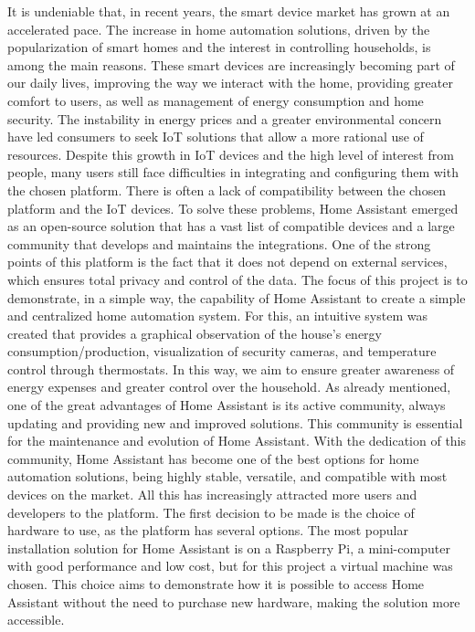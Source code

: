 \documentclass[graybox]{svmult}
\begin{document}
It is undeniable that, in recent years, the smart device market has grown at an accelerated pace. The increase in home automation solutions, driven by the popularization of smart homes and the interest in controlling households, is among the main reasons. These smart devices are increasingly becoming part of our daily lives, improving the way we interact with the home, providing greater comfort to users, as well as management of energy consumption and home security. The instability in energy prices and a greater environmental concern have led consumers to seek IoT solutions that allow a more rational use of resources.
Despite this growth in IoT devices and the high level of interest from people, many users still face difficulties in integrating and configuring them with the chosen platform. There is often a lack of compatibility between the chosen platform and the IoT devices. To solve these problems, Home Assistant emerged as an open-source solution that has a vast list of compatible devices and a large community that develops and maintains the integrations. One of the strong points of this platform is the fact that it does not depend on external services, which ensures total privacy and control of the data.
The focus of this project is to demonstrate, in a simple way, the capability of Home Assistant to create a simple and centralized home automation system. For this, an intuitive system was created that provides a graphical observation of the house’s energy consumption/production, visualization of security cameras, and temperature control through thermostats. In this way, we aim to ensure greater awareness of energy expenses and greater control over the household.
As already mentioned, one of the great advantages of Home Assistant is its active community, always updating and providing new and improved solutions. This community is essential for the maintenance and evolution of Home Assistant. With the dedication of this community, Home Assistant has become one of the best options for home automation solutions, being highly stable, versatile, and compatible with most devices on the market. All this has increasingly attracted more users and developers to the platform.
The first decision to be made is the choice of hardware to use, as the platform has several options. The most popular installation solution for Home Assistant is on a Raspberry Pi, a mini-computer with good performance and low cost, but for this project a virtual machine was chosen. This choice aims to demonstrate how it is possible to access Home Assistant without the need to purchase new hardware, making the solution more accessible.
\end{document}
